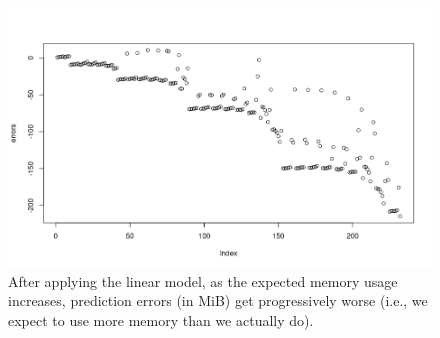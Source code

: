 \documentclass{article}
\begin{document}
\begin{figure}
  \centering
  \includegraphics[width=\textwidth]{../io_local_tests/post_fix_errors.png}
  \caption{After applying the linear model, as the expected memory usage
    increases, prediction errors (in MiB) get progressively worse (i.e., we
    expect to use more memory than we actually do).}
\end{figure}
\end{document}
